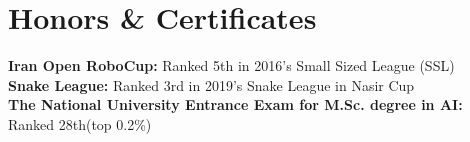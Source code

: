 
\section{Honors \& Certificates}
  \vspace{2pt}
  \resumeSubHeadingListStart
    \small{\item{
        \textbf{Iran Open RoboCup:} { Ranked 5th in 2016's Small Sized League (SSL)}
        \\ \vspace{3pt}
        \textbf{Snake League:} { Ranked 3rd in 2019's Snake League in Nasir Cup}
        \\ \vspace{3pt}
        \textbf{The National University Entrance Exam for M.Sc. degree in AI:} { Ranked 28th(top 0.2\%)}
    }}
  \resumeSubHeadingListEnd
